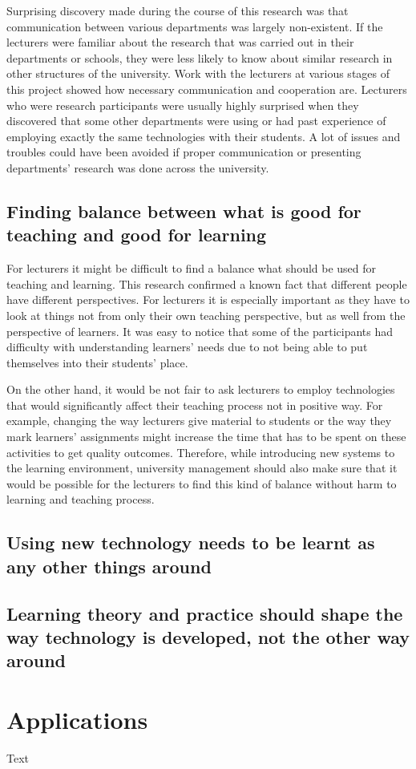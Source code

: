 Surprising discovery made during the course of this research was that
communication between various departments was largely non-existent. If the
lecturers were familiar about the research that was carried out in their
departments or schools, they were less likely to know about similar research in
other structures of the university. Work with the lecturers at various stages of
this project showed how necessary communication and cooperation are. Lecturers
who were research participants were usually highly surprised when they
discovered that some other departments were using or had past experience of
employing exactly the same technologies with their students. A lot of issues and
troubles could have been avoided if proper communication or presenting
departments' research was done across the university.

\subsection[Finding Balance]{Finding balance between what is good for teaching
and good for learning}

For lecturers it might be difficult to find a balance what should be used for
teaching and learning. This research confirmed a known fact that different
people have different perspectives. For lecturers it is especially important as
they have to look at things not from only their own teaching perspective, but as
well from the perspective of learners. It was easy to notice that some of the
participants had difficulty with understanding learners' needs due to not being
able to put themselves into their students' place.

On the other hand, it would be not fair to ask lecturers to employ technologies
that would significantly affect their teaching process not in positive way. For
example, changing the way lecturers give material to students or the way they
mark learners' assignments might increase the time that has to be spent on
these activities to get quality outcomes. Therefore, while introducing new
systems to the learning environment, university management should also make
sure that it would be possible for the lecturers to find this kind of balance
without harm to learning and teaching process.

\subsection[Learning to Use Technology]{Using new technology needs to be learnt
as any other things around}

\subsection[Shaping Technology for Learning Needs]{Learning theory and practice
should shape the way technology is developed, not the other way around}



\section{Applications}

Text

